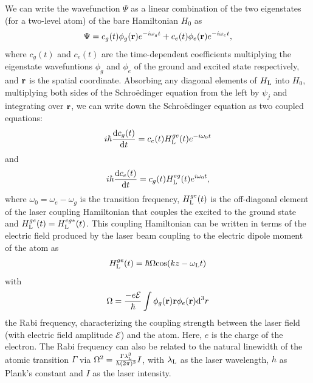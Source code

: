 We can write the wavefunction $\Psi$ as a linear combination of the two eigenstates (for a two-level atom) of the bare Hamiltonian $H_0$ as 
\begin{equation}
\Psi = c_g(t)\phi_g ({\bf r})e^{-i\omega_g t} + c_e(t)\phi_e ({\bf r})e^{-i\omega_e t},
\end{equation}
where $c_g(t)$ and $c_e(t)$ are the time-dependent coefficients multiplying the eigenstate wavefuntions $\phi_g$ and $\phi_e$ of the ground and excited state respectively, and ${\bf r}$ is the spatial coordinate. Absorbing any diagonal elements of $H_{\rm L}$ into $H_0$, multiplying both sides of the Schro\"edinger equation from the left by $\psi_j$ and integrating over ${\bf r}$, we can write down the Schro\"edinger equation as two coupled equations:
\begin{equation}
i\hbar\frac{{\rm d}c_g(t)}{{\rm d}t} = c_e(t) H_{\rm L}^{ge}(t)e^{-i\omega_0t}
\end{equation}
and 
\begin{equation}
i\hbar\frac{{\rm d}c_e(t)}{{\rm d}t} = c_g(t) H_{\rm L}^{eg}(t)e^{i\omega_0t},
\end{equation}
where $\omega_0 = \omega_e - \omega_g$ is the transition frequency, $ H_{\rm L}^{ge}(t)$ is the off-diagonal element of the laser coupling Hamiltonian that couples the excited to the ground state and  $H_{\rm L}^{ge}(t)= H_{\rm L}^{eg*}(t)$. This coupling Hamiltonian can be written in terms of the electric field produced by the laser beam coupling to the electric dipole moment of the atom as
\begin{equation}
 H_{\rm L}^{ge}(t) = \hbar \Omega {\rm cos}(kz - \omega_{\rm L} t)
\end{equation}
with
\begin{equation}
\Omega = \frac{-e\mathcal{E}}{\hbar}\int \phi_g({\bf r}) {\bf r} \phi_e ({\bf r}) {\rm d}^3 r
\end{equation}
the Rabi frequency, characterizing the coupling strength between the laser field (with electric field amplitude $\mathcal{E}$) and the atom. Here, $e$ is the charge of the electron. The Rabi frequency can also be related to the natural linewidth of the atomic transition $\Gamma$ via $\Omega^2 = \frac{\Gamma\lambda_{\rm L}^3}{h(2\pi)^3}I$, with $\lambda_{\rm L}$ as the laser wavelength, $h$ as Plank's constant and $I$ as the laser intensity.

